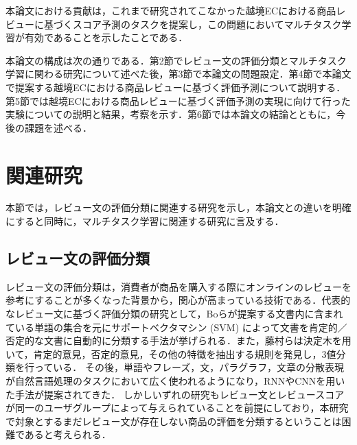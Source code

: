 \documentclass[dvipdfmx,twocolumn,10.5pt]{jsarticle}
\begin{document}
本論文における貢献は，これまで研究されてこなかった越境ECにおける商品レビューに基づくスコア予測のタスクを提案し，この問題においてマルチタスク学習が有効であることを示したことである．

本論文の構成は次の通りである．第2節でレビュー文の評価分類とマルチタスク学習に関わる研究について述べた後，第3節で本論文の問題設定．第4節で本論文で提案する越境ECにおける商品レビューに基づく評価予測について説明する．第5節では越境ECにおける商品レビューに基づく評価予測の実現に向けて行った実験についての説明と結果，考察を示す．第6節では本論文の結論とともに，今後の課題を述べる．

\section{関連研究}\label{related-works}
本節では，レビュー文の評価分類に関連する研究を示し，本論文との違いを明確にすると同時に，マルチタスク学習に関連する研究に言及する．


\subsection{レビュー文の評価分類}\label{sentiment_analysis}
レビュー文の評価分類は，消費者が商品を購入する際にオンラインのレビューを参考にすることが多くなった背景から，関心が高まっている技術である．代表的なレビュー文に基づく評価分類の研究として，Boらが提案する文書内に含まれている単語の集合を元にサポートベクタマシン (SVM) によって文書を肯定的／否定的な文書に自動的に分類する手法\cite{pang2002thumbs}が挙げられる．また，藤村らは決定木を用いて，肯定的意見，否定的意見，その他の特徴を抽出する規則を発見し，3値分類を行っている．\cite{dunning1993accurate}
その後，単語やフレーズ，文，パラグラフ，文章の分散表現が自然言語処理のタスクにおいて広く使われるようになり，RNNやCNNを用いた手法が提案されてきた．\cite{liu2015multi}\cite{kalchbrenner2014convolutional}\cite{le2014distributed}\cite{socher2013recursive}
しかしいずれの研究もレビュー文とレビュースコアが同一のユーザグループによって与えられていることを前提にしており，本研究で対象とするまだレビュー文が存在しない商品の評価を分類するということは困難であると考えられる．
\end{document}

